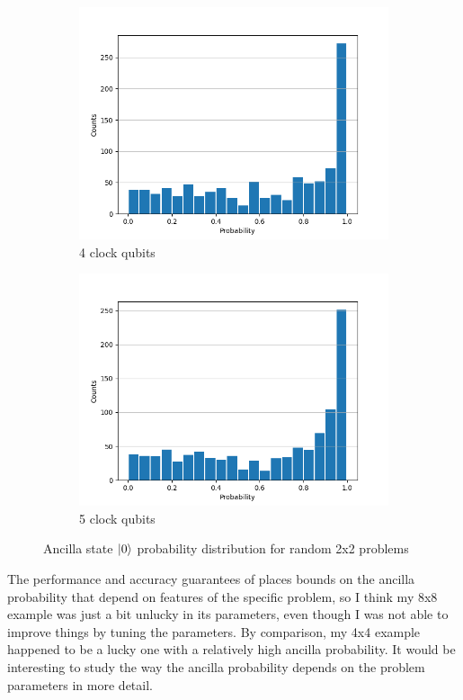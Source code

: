 \documentclass[12pt]{extarticle}
\begin{document}
\begin{figure}[htbp]
\begin{subfigure}[b]{0.45\textwidth}
        \centering
        \includegraphics[width=\textwidth]{images/ancilla_frequency_dist_2x2b4.png}
        \caption{4 clock qubits}
    \end{subfigure}
    \hfill
    \begin{subfigure}[b]{0.45\textwidth}
        \centering
        \includegraphics[width=\textwidth]{images/ancilla_frequency_dist_2x2b5.png}
        \caption{5 clock qubits}
    \end{subfigure}
    \caption{Ancilla state $\ket{0}$ probability distribution for random 2x2 problems}
    \label{fig:ancilla_frequency_dist_2x2}
\end{figure}

The performance and accuracy guarantees of \cite{hhl2009} places bounds on the ancilla probability that depend on features of the specific problem,
so I think my 8x8 example was just a bit unlucky in its parameters, even though I was not able to improve things by tuning the parameters.
By comparison, my 4x4 example happened to be a lucky one with a relatively high ancilla probability.
It would be interesting to study the way the ancilla probability depends on the problem parameters in more detail.
\end{document}
